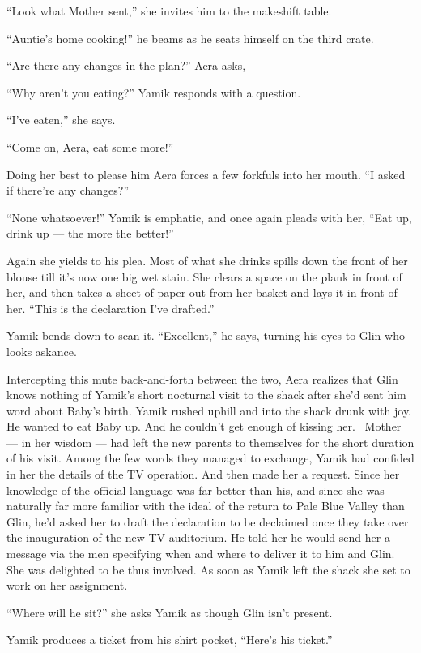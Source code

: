 \documentclass[twoside,11pt]{book}
\begin{document}
``Look what Mother sent,'' she invites him to the makeshift table.

``Auntie's home cooking!'' he beams as he seats himself on the third crate.

``Are there any changes in the plan?'' Aera asks,

``Why aren't you eating?'' Yamik responds with a question.

``I've eaten,'' she says.

``Come on, Aera, eat some more!''

Doing her best to please him Aera forces a few forkfuls into her mouth. ``I asked if there're any
changes?''

``None whatsoever!'' Yamik is emphatic, and once again pleads with her, ``Eat up, drink up --- the more the better!''

Again she yields to his plea. Most of what she drinks spills down the front of her blouse till it's now one big wet
stain. She clears a space on the plank in front of her, and then takes a sheet of paper out from her basket and lays it
in front of her. ``This is the declaration I've drafted.''

Yamik bends down to scan it. ``Excellent,'' he says, turning his eyes to Glin who looks
askance.

Intercepting this mute back-and-forth between the two, Aera realizes that Glin knows nothing of Yamik's short nocturnal
visit to the shack after she'd sent him word about Baby's birth. Yamik rushed uphill and into the shack  drunk with
joy. He wanted to eat Baby up. And he{ }couldn't get enough of kissing her. ~Mother --- in her wisdom
--- had left the new parents to themselves for the short duration of his visit. Among the few words they managed to
exchange, Yamik had confided in her the details of the TV operation. And then made her a request. Since her knowledge
of the official language was far better than his, and since she was naturally far more familiar with the ideal of the
return to  Pale Blue Valley than Glin, he'd asked her to draft the declaration to be declaimed once they take over
the inauguration of the new TV auditorium. He told her he would send her a message via the men specifying when and
where to deliver it to him and Glin. She was delighted to be thus involved. As soon as Yamik left the shack she set to
work on her assignment{. }

``Where will he sit?'' she asks Yamik as though Glin isn't present.

Yamik produces a ticket from his shirt pocket, ``Here's his ticket.''
\end{document}
